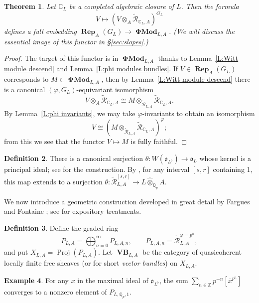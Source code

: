 \documentclass[12pt]{amsart}
\newtheorem{theorem}{Theorem}[section]
\theoremstyle{definition}
\newtheorem{defn}[theorem]{Definition}
\newtheorem{example}[theorem]{Example}
\numberwithin{equation}{theorem}
\newcommand{\CC}{\mathbb{C}}
\newcommand{\QQ}{\mathbb{Q}}
\newcommand{\ZZ}{\mathbb{Z}}
\newcommand{\calR}{\mathcal{R}}
\newcommand{\frako}{\mathfrak{o}}
\DeclareMathOperator{\PhiMod}{\mathbf{\Phi Mod}}
\DeclareMathOperator{\Proj}{Proj}
\DeclareMathOperator{\Rep}{\mathbf{Rep}}
\DeclareMathOperator{\VB}{\mathbf{VB}}
\begin{document}
\begin{theorem} \label{T:perfect embedding}
Let $\CC_L$ be a completed algebraic closure of $L$. Then the formula 
\[
V \mapsto (V \otimes_A \tilde{\calR}_{\CC_L, A})^{G_L}
\]
defines a full embedding $\Rep_A(G_L) \to \PhiMod_{L,A}$.
(We will discuss the essential image of this functor in \S\ref{sec:slopes}.)
\end{theorem}
\begin{proof}
The target of this functor is in $\PhiMod_{L,A}$ thanks to 
Lemma~\ref{L:Witt module descend} and Lemma~\ref{L:phi modules bundles}.
If $V \in \Rep_A(G_L)$ corresponds to $M \in \PhiMod_{L,A}$, 
then by Lemma~\ref{L:Witt module descend} there is a canonical $(\varphi, G_L)$-equivariant isomorphism
\[
V \otimes_A \tilde{\calR}_{\CC_L, A} \cong M \otimes_{\tilde{\calR}_{L,A}} \tilde{\calR}_{\CC_L,A}.
\]
By Lemma~\ref{L:phi invariants}, we may take $\varphi$-invariants to obtain an isomorphism
\[
V \cong (M \otimes_{\tilde{\calR}_{L,A}} \tilde{\calR}_{\CC_L,A})^{\varphi};
\]
from this we see that the functor $V \mapsto M$ is fully faithful.
\end{proof}

\begin{defn} \label{D:theta}
There is a canonical surjection $\theta: W(\frako_{L^\flat}) \to \frako_L$ whose kernel is a principal ideal; see
\cite[\S 1]{kedlaya-new-phigamma} for the construction.
By \cite[Lemma~5.5.5]{kedlaya-liu1}, for any interval $[s,r]$ containing 1,
this map extends to a surjection
$\theta: \tilde{\calR}^{[s,r]}_{L,A} \to L \widehat{\otimes}_{\QQ_p} A$.
\end{defn}

We now introduce a geometric construction developed in great detail by Fargues and Fontaine
\cite{fargues-fontaine}; see \cite{fargues, fargues-fontaine-durham} for expository treatments.
\begin{defn}
Define the graded ring
\[
P_{L,A} = \bigoplus_{n=0}^\infty P_{L,A,n}, \qquad P_{L,A,n} = \tilde{\calR}_{L,A}^{\varphi=p^n},
\]
and put $X_{L,A} = \Proj(P_{L,A})$.
Let $\VB_{L,A}$ be the category of quasicoherent locally finite free sheaves (or for short \emph{vector bundles}) on $X_{L,A}$.
\end{defn}

\begin{example}
For any $x$ in the maximal ideal of $\frako_{L^{\flat}}$, the sum $\sum_{n \in \ZZ} p^{-n} [\overline{x}^{p^n}]$
converges to a nonzero element of $P_{L,\QQ_p,1}$.
\end{example}
\end{document}
